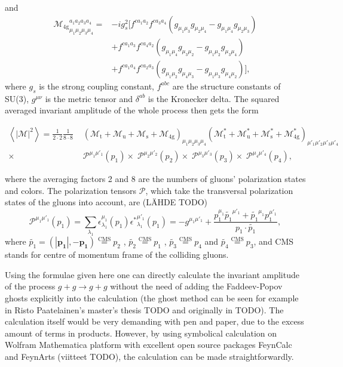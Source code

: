 \documentclass[a4paper, twoside, english, 12pt]{article}
\begin{document}
and
\begin{align*}
{\mathcal{M}_\text{4g}}_{\mu_1\mu_2\mu_3\mu_4}^{a_1a_2a_3a_4} = &-ig_s^2\Big[f^{ca_1a_2}f^{ca_3a_4}( g_{\mu_1\mu_3}g_{\mu_2\mu_4} - g_{\mu_1\mu_4}g_{\mu_2\mu_3})\\
&+ f^{ca_1a_3}f^{ca_4a_2}( g_{\mu_1\mu_4}g_{\mu_3\mu_2} - g_{\mu_1\mu_2}g_{\mu_3\mu_4}) \\ 
&+ f^{ca_1a_4}f^{ca_2a_3}( g_{\mu_1\mu_2}g_{\mu_4\mu_3} - g_{\mu_1\mu_3}g_{\mu_4\mu_2})\Big],
\end{align*}
where $g_s$ is the strong coupling constant, $f^{abc}$ are the structure constants of SU(3), $g^{\mu\nu}$ is the metric tensor and $\delta^{ab}$ is the Kronecker delta. The squared averaged invariant amplitude of the whole process then gets the form

\begin{align}
\textstyle\left\langle|\mathcal{M}|^2\right\rangle = \frac{1}{2\cdot 2}\frac{1}{8\cdot 8}\,\,&\left(\mathcal{M}_\text{t}+\mathcal{M}_\text{u}+\mathcal{M}_\text{s}+\mathcal{M}_\text{4g}\right)_{\mu_1\mu_2\mu_3\mu_4}\left(\mathcal{M}_\text{t}^*+\mathcal{M}_\text{u}^*+\mathcal{M}_\text{s}^*+\mathcal{M}_\text{4g}^*\right)_{\mu'_1\mu'_2\mu'_3\mu'_4} \\\nonumber
\displaystyle\times\; & \mathcal{P}^{\mu_1^{ }\mu'_1} (p_1)  \times\; \mathcal{P}^{\mu_2^{ }\mu'_2} (p_2)  \times\; \mathcal{P}^{\mu_3^{ }\mu'_3} (p_3)  \times\; \mathcal{P}^{\mu_4^{ }\mu'_4} (p_4),
\end{align}

where the averaging factors 2 and 8 are the numbers of gluons' polarization states and colors. The polarization tensors $\mathcal{P}$, which take the transversal polarization states of the gluons into account, are (LÄHDE TODO) 
\begin{equation}\label{E:ptensorcovariant}
\mathcal{P}^{\mu_1^{ }\mu'_1} (p_1) =\sum_{\lambda_1}\epsilon_{\lambda_1}^{\mu_1}(p_1) {\epsilon^*}_{\lambda_1}^{\mu'_1}(p_1) =  -g^{\mu_1^{ }\mu'_1} + \frac{p_1^{\mu_1^{ }}\tilde{p_1}^{\mu'_1}+\tilde{p_1}^{\mu_1^{ }}p_1^{\mu'_1}}{p_1\cdot\tilde{p_1}},
\end{equation}
where $\tilde{p_1}=(|\mathbf{p_1}|,-\mathbf{p_1})
\overset{\text{CMS}}{=}p_2$ , $\tilde{p_2}\overset{\text{CMS}}{=}p_1$ , $\tilde{p_3}\overset{\text{CMS}}{=}p_4$ and $\tilde{p_4}\overset{\text{CMS}}{=}p_3$, and CMS stands for centre of momentum frame of the colliding gluons.

Using the formulae given here one can directly calculate the invariant amplitude of the process $g+g\rightarrow g+g$ without the need of adding the Faddeev-Popov ghosts explicitly into the calculation (the ghost method can be seen for example in Risto Paatelainen's master's thesis TODO and originally in TODO). The calculation itself would be very demanding with pen and paper, due to the excess amount of terms in products. However, by using symbolical calculation on Wolfram Mathematica platform with excellent open source packages FeynCalc and FeynArts (viitteet TODO), the calculation can be made straightforwardly. 
\end{document}
